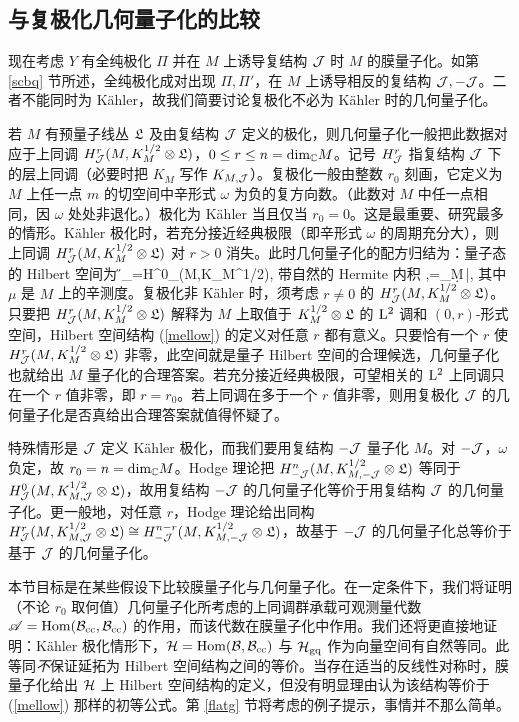 \subsection{与复极化几何量子化的比较}\label{branecp}

现在考虑 $Y$ 有全纯极化 $\varPi$ 并在 $M$ 上诱导复结构 ${\mathcal J}$ 时 $M$ 的膜量子化。如第 \ref{scbq} 节所述，全纯极化成对出现 $\varPi,\varPi'$，在 $M$ 上诱导相反的复结构 ${\mathcal J},-{\mathcal J}$。二者不能同时为 Kähler，故我们简要讨论复极化不必为 Kähler 时的几何量子化。

若 $M$ 有预量子线丛 ${\mathfrak L}$ 及由复结构 ${\mathcal J}$ 定义的极化，则几何量子化一般把此数据对应于上同调 $H^r_{\mathcal J}(M,K_M^{1/2}\otimes{\mathfrak L})$，$0\le r\le n={\mathrm{dim}}_{\mathbb C} M$。记号 $H^r_{\mathcal J}$ 指复结构 ${\mathcal J}$ 下的层上同调（必要时把 $K_M$ 写作 $K_{M,{\mathcal J}}$）。复极化一般由整数 $r_0$ 刻画，它定义为 $M$ 上任一点 $m$ 的切空间中辛形式 $\omega$ 为负的复方向数。（此数对 $M$ 中任一点相同，因 $\omega$ 处处非退化。）极化为 Kähler 当且仅当 $r_0=0$。这是最重要、研究最多的情形。Kähler 极化时，若充分接近经典极限（即辛形式 $\omega$ 的周期充分大），则上同调 $H^r_{\mathcal J}(M,K_M^{1/2}\otimes{\mathfrak L})$ 对 $r>0$ 消失。此时几何量子化的配方归结为：量子态的 Hilbert 空间为
\be\label{defq} \H_\gq=H^0_\J(M,K_M^{1/2}\otimes\frL),\ee
带自然的 Hermite 内积
\be\label{mellow}\la\chi,\psi\ra=\int_M\d\mu\,\bar\chi\psi,\ee
其中 $\mu$ 是 $M$ 上的辛测度。复极化非 Kähler 时，须考虑 $r\ne0$ 的 $H^r_{\mathcal J}(M,K_M^{1/2}\otimes{\mathfrak L})$。只要把 $H^r_{\mathcal J}(M,K_M^{1/2}\otimes{\mathfrak L})$ 解释为 $M$ 上取值于 $K_M^{1/2}\otimes{\mathfrak L}$ 的 ${\mathrm L}^2$ 调和 $(0,r)$-形式空间，Hilbert 空间结构 (\ref{mellow}) 的定义对任意 $r$ 都有意义。只要恰有一个 $r$ 使 $H^r_{\mathcal J}(M,K_M^{1/2}\otimes{\mathfrak L})$ 非零，此空间就是量子 Hilbert 空间的合理候选，几何量子化也就给出 $M$ 量子化的合理答案。若充分接近经典极限，可望相关的 ${\mathrm L}^2$ 上同调只在一个 $r$ 值非零，即 $r=r_0$。若上同调在多于一个 $r$ 值非零，则用复极化 ${\mathcal J}$ 的几何量子化是否真给出合理答案就值得怀疑了。

特殊情形是 ${\mathcal J}$ 定义 Kähler 极化，而我们要用复结构 $-{\mathcal J}$ 量子化 $M$。对 $-{\mathcal J}$，$\omega$ 负定，故 $r_0=n={\mathrm{dim}}_{\mathbb C} M$。Hodge 理论把 $H^n_{-{\mathcal J}}(M,K_{M,-{\mathcal J}}^{1/2}\otimes{\mathfrak L})$ 等同于 $H^0_{\mathcal J}(M,K_{M,{\mathcal J}}^{1/2}\otimes{\mathfrak L})$，故用复结构 $-{\mathcal J}$ 的几何量子化等价于用复结构 ${\mathcal J}$ 的几何量子化。更一般地，对任意 $r$，Hodge 理论给出同构 $H^r_{\mathcal J}(M,K_{M,{\mathcal J}}^{1/2}\otimes{\mathfrak L})\cong H^{n-r}_{-{\mathcal J}}(M,K_{M,-{\mathcal J}}^{1/2}\otimes{\mathfrak L})$，故基于 $-{\mathcal J}$ 的几何量子化总等价于基于 ${\mathcal J}$ 的几何量子化。

本节目标是在某些假设下比较膜量子化与几何量子化。在一定条件下，我们将证明（不论 $r_0$ 取何值）几何量子化所考虑的上同调群承载可观测量代数 ${\mathscr A}={\mathrm{Hom}}({\mathcal B}_{\mathrm{cc}},{\mathcal B}_{\mathrm{cc}})$ 的作用，而该代数在膜量子化中作用。我们还将更直接地证明：Kähler 极化情形下，${\mathcal H}={\mathrm{Hom}}({\mathcal B},{\mathcal B}_{\mathrm{cc}})$ 与 ${\mathcal H}_{\mathrm{gq}}$ 作为向量空间有自然等同。此等同\emph{不}保证延拓为 Hilbert 空间结构之间的等价。当存在适当的反线性对称时，膜量子化给出 ${\mathcal H}$ 上 Hilbert 空间结构的定义，但没有明显理由认为该结构等价于 (\ref{mellow}) 那样的初等公式。第 \ref{flatg} 节将考虑的例子提示，事情并不那么简单。


